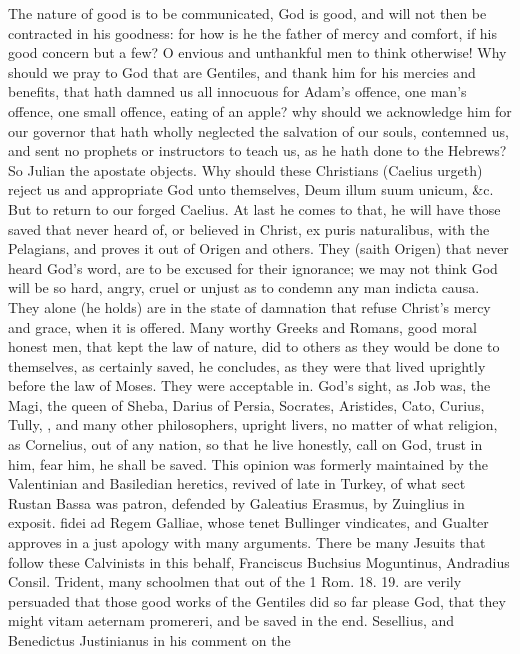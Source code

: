 {The nature of good is to be communicated, God is good, and will not
then be contracted in his goodness: for how is he the father of mercy
and comfort, if his good concern but a few? O envious and unthankful
men to think otherwise! Why should we pray to God that are
Gentiles, and thank him for his mercies and benefits, that hath damned
us all innocuous for Adam's offence, one man's offence, one small
offence, eating of an apple? why should we acknowledge him for our
governor that hath wholly neglected the salvation of our souls,
contemned us, and sent no prophets or instructors to teach us, as he
hath done to the Hebrews? So Julian the apostate objects. Why should
these Christians (Caelius urgeth) reject us and appropriate God unto
themselves, Deum illum suum unicum, \&c. But to return to our forged
Caelius. At last he comes to that, he will have those saved that never
heard of, or believed in Christ, ex puris naturalibus, with the
Pelagians, and proves it out of Origen and others. They (saith
Origen) that never heard God's word, are to be excused for their
ignorance; we may not think God will be so hard, angry, cruel or unjust
as to condemn any man indicta causa. They alone (he holds) are in the
state of damnation that refuse Christ's mercy and grace, when it is
offered. Many worthy Greeks and Romans, good moral honest men, that
kept the law of nature, did to others as they would be done to
themselves, as certainly saved, he concludes, as they were that lived
uprightly before the law of Moses. They were acceptable in. God's
sight, as Job was, the Magi, the queen of Sheba, Darius of Persia,
Socrates, Aristides, Cato, Curius, Tully, \Seneca, and many other
philosophers, upright livers, no matter of what religion, as Cornelius,
out of any nation, so that he live honestly, call on God, trust in him,
fear him, he shall be saved. This opinion was formerly maintained by
the Valentinian and Basiledian heretics, revived of late in
Turkey, of what sect Rustan Bassa was patron, defended by
Galeatius Erasmus, by Zuinglius in exposit. fidei ad Regem
Galliae, whose tenet Bullinger vindicates, and Gualter approves in a
just apology with many arguments. There be many Jesuits that follow
these Calvinists in this behalf, Franciscus Buchsius Moguntinus,
Andradius Consil. Trident, many schoolmen that out of the 1 Rom.  18.
19. are verily persuaded that those good works of the Gentiles did so
far please God, that they might vitam aeternam promereri, and be saved
in the end. Sesellius, and Benedictus Justinianus in his comment on the
}
